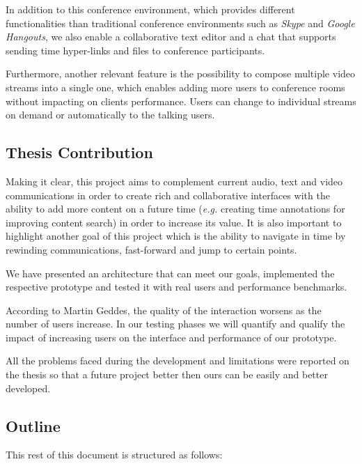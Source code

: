 \documentclass[conference,compsoc,a4paper]{IEEEtran}
\begin{document}
	In addition to this conference environment, which provides different functionalities than traditional conference environments such as \emph{Skype} and \emph{Google Hangouts}, we also enable a collaborative text editor and a chat that supports sending time hyper-links and files to conference participants.

	Furthermore, another relevant feature is the possibility to compose multiple video streams into a single one, which enables adding more users to conference rooms without impacting on clients performance. Users can change to individual streams on demand or automatically to the talking users.
        

\subsection{Thesis Contribution}
\label{section:contribution}

Making it clear, this project aims to complement current audio, text and video communications in order to create rich and collaborative interfaces with the ability to add more content on a future time (\emph{e.g.} creating time annotations for improving content search) in order to increase its value. It is also important to highlight another goal of this project which is the ability to navigate in time by rewinding communications, fast-forward and jump to certain points.

	We have presented an architecture that can meet our goals, implemented the respective prototype and tested it with real users and performance benchmarks.

	According to Martin Geddes, the quality of the interaction worsens as the number of users increase\cite{geddes}. In our testing phases we will quantify and qualify the impact of increasing users on the interface and performance of our prototype. 

	All the problems faced during the development and limitations were reported on the thesis so that a future project better then ours can be easily and better developed.

\subsection{Outline}

This rest of this document is structured as follows:
\end{document}

